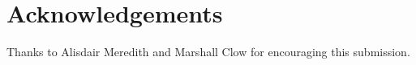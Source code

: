 \section{Acknowledgements}

Thanks to Alisdair Meredith and Marshall Clow for encouraging this submission.
